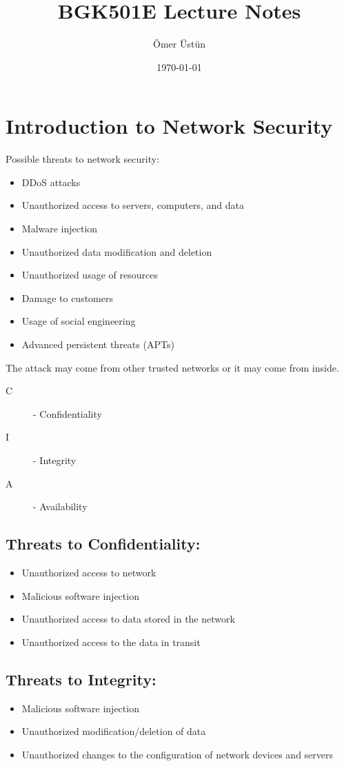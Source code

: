 \documentclass[12pt]{article}
\begin{document}
\title{BGK501E Lecture Notes}
\date{\today}
\author{Ömer Üstün}
\maketitle

\section*{Introduction to Network Security}

Possible threats to network security:

\begin{itemize}
    \item DDoS attacks
    \item Unauthorized access to servers, computers, and data
    \item Malware injection
    \item Unauthorized data modification and deletion
    \item Unauthorized usage of resources
    \item Damage to customers
    \item Usage of social engineering
    \item Advanced persistent threats (APTs)
\end{itemize}

The attack may come from other trusted networks or it may come from inside.

\begin{description}
    \item[C]- Confidentiality
    \item[I]- Integrity
    \item[A]- Availability 
\end{description}

\subsection*{Threats to Confidentiality:}
\begin{itemize}
    \item Unauthorized access to network
    \item Malicious software injection
    \item Unauthorized access to data stored in the network
    \item Unauthorized access to the data in transit
\end{itemize}

\subsection*{Threats to Integrity:}
\begin{itemize}
    \item Malicious software injection
    \item Unauthorized modification/deletion of data
    \item Unauthorized changes to the configuration of network devices and servers
\end{itemize}
\end{document}
